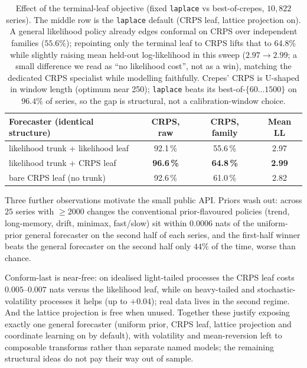 \documentclass[article]{jss}
\providecommand{\code}[1]{\texttt{#1}}
\begin{document}
\begin{table}[h!]
\centering
\begin{tabular}{lccc}
\toprule
Forecaster (identical structure) & CRPS, raw & CRPS, family & Mean LL \\
\midrule
likelihood trunk + likelihood leaf & 92.1\,\% & 55.6\,\% & 2.97 \\
likelihood trunk + CRPS leaf       & \textbf{96.6\,\%} & \textbf{64.8\,\%} & \textbf{2.99} \\
bare CRPS leaf (no trunk)          & 92.6\,\% & 61.0\,\% & 2.82 \\
\bottomrule
\end{tabular}
\caption{Effect of the terminal-leaf objective (fixed \code{laplace} vs
best-of-crepes, $10{,}822$ series). The middle row is the \code{laplace} default
(CRPS leaf, lattice projection on). A general likelihood policy already edges conformal on CRPS over independent
families ($55.6\%$); repointing only the terminal leaf to CRPS lifts that to
$64.8\%$ while slightly raising mean held-out log-likelihood in this sweep
($2.97 \rightarrow 2.99$; a small difference we read as ``no likelihood cost'',
not as a win), matching the dedicated CRPS specialist while modelling
faithfully. Crepes' CRPS is U-shaped in
window length (optimum near 250); \code{laplace} beats its best-of-$\{60\dots1500\}$
on $96.4\%$ of series, so the gap is structural, not a calibration-window choice.}
\label{tab:objective}
\end{table}

Three further observations motivate the small public API. Priors wash out:
across $25$ series with $\geq 2000$ changes the conventional prior-flavoured
policies (trend, long-memory, drift, minimax, fast/slow) sit within $0.0006$ nats
of the uniform-prior general forecaster on the second half of each series, and the
first-half winner beats the general forecaster on the second half only $44\%$ of
the time, worse than chance.

Conform-last is near-free: on idealised light-tailed
processes the CRPS leaf costs $0.005$--$0.007$ nats versus the likelihood leaf,
while on heavy-tailed and stochastic-volatility processes it helps (up to
$+0.04$); real data lives in the second regime. And the lattice projection is free
when unused. Together these justify exposing exactly one general forecaster
(uniform prior, CRPS leaf, lattice projection and coordinate learning on by
default), with volatility and mean-reversion left to composable transforms rather
than separate named models; the remaining structural ideas do not pay their way
out of sample.
\end{document}
